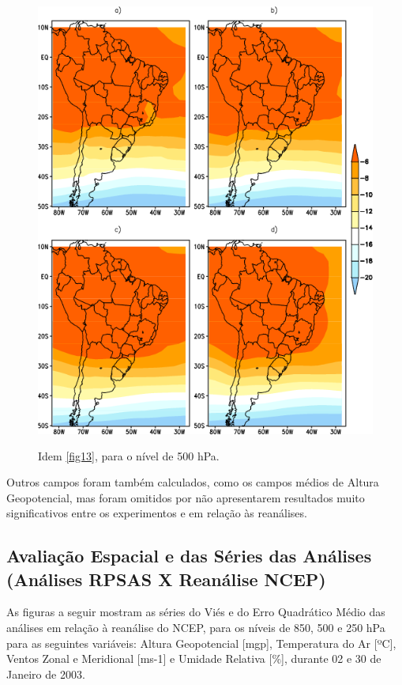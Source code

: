 \begin{figure}[!hbp]
\centering
\includegraphics[height=15cm]{./figs/media_temp_anl_500hPa.png}
\caption{Idem \autoref{fig13}, para o nível de 500 hPa.}
\label{fig21}
\end{figure}

Outros campos foram também calculados, como os campos médios de Altura Geopotencial, mas foram omitidos por não apresentarem resultados muito significativos entre os experimentos e em relação às reanálises.

\subsection{Avaliação Espacial e das Séries das Análises (Análises RPSAS X Reanálise NCEP)}
\label{ss:avalesanl}

As figuras a seguir mostram as séries do Viés e do Erro Quadrático Médio das análises em relação à reanálise do NCEP, para os níveis de 850, 500 e 250 hPa para as seguintes variáveis: Altura Geopotencial [mgp], Temperatura do Ar [ºC], Ventos Zonal e Meridional [ms-1] e Umidade Relativa [$\%$], durante 02 e 30 de Janeiro de 2003.

